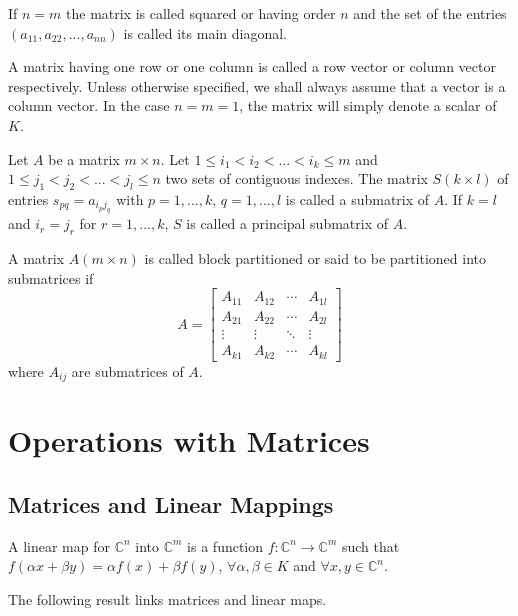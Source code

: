 If $n = m$ the matrix is called squared or having order $n$ and the set of the entries $(a_{11}, a_{22}, ..., a_{nn})$ is called its main diagonal.

A matrix having one row or one column is called a row vector or column vector respectively. Unless otherwise specified, we shall always assume that a vector is a column vector. In the case $n = m = 1$, the matrix will simply denote a scalar of $K$.

\begin{definition}
    Let $A$ be a matrix $m  \times n$. Let $1 \leq i_1 < i_2 < ... < i_k \leq m$ and $1 \leq j_1 < j_2 < ... < j_l \leq n$ two sets of contiguous indexes. The matrix $S(k \times l)$ of entries $s_{pq} = a_{i_p j_q}$ with $p = 1, ..., k$, $q = 1, ..., l$ is called a submatrix of $A$. If $k = l$ and $i_r = j_r$ for $r = 1, ..., k$, $S$ is called a principal submatrix of $A$.
\end{definition}

\begin{definition}
    A matrix $A(m \times n)$ is called block partitioned or said to be partitioned into submatrices if 
    \[A = \begin{bmatrix}
        A_{11} & A_{12} & \cdots & A_{1l} \\
        A_{21} & A_{22} & \cdots & A_{2l} \\
        \vdots & \vdots & \ddots & \vdots \\
        A_{k1} & A_{k2} & \cdots & A_{kl}
    \end{bmatrix}\]
    where $A_{ij}$ are submatrices of $A$.
\end{definition}

\section{Operations with Matrices}
\subsection{Matrices and Linear Mappings}
\begin{definition}
    A linear map for $\mathbb{C}^n$ into $\mathbb{C}^m$ is a function $f: \mathbb{C}^n \rightarrow \mathbb{C}^m$ such that $f(\alpha x + \beta y) = \alpha f(x) + \beta f(y)$, $\forall \alpha , \beta \in K$ and $\forall x, y \in \mathbb{C}^n$.
\end{definition}

The following result links matrices and linear maps.

